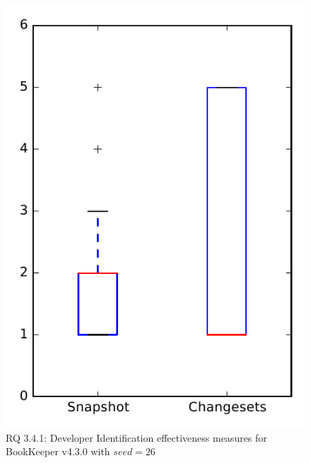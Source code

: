 
\begin{figure}
\centering
\includegraphics[height=0.4\textheight]{figures/dit_seed/rq1_bookkeeper_26}
\caption{RQ 3.4.1: Developer Identification effectiveness measures for BookKeeper v4.3.0 with $seed=26$}
\label{fig:dit_seed:rq1:bookkeeper}
\end{figure}
